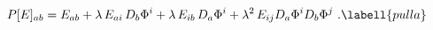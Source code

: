 \begin{equation}
P[E]_{ab}=E_{ab}+\lambda\,E_{ai}\,D_{b}\Phi^i+ \lambda\,E_{ib}\,
D_a\Phi^i+ \lambda^2\,E_{ij}D_a\Phi^iD_b\Phi^j\ . \labell{pulla}
\end{equation}

